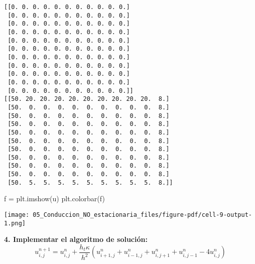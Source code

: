 \documentclass[
  letterpaper,
  DIV=11,
  numbers=noendperiod]{scrreprt}
\newenvironment{Shaded}{\begin{snugshade}}{\end{snugshade}}
\newcommand{\NormalTok}[1]{\textcolor[rgb]{0.00,0.23,0.31}{#1}}
\newcommand{\OperatorTok}[1]{\textcolor[rgb]{0.37,0.37,0.37}{#1}}
\begin{document}
\begin{verbatim}
[[0. 0. 0. 0. 0. 0. 0. 0. 0. 0. 0.]
 [0. 0. 0. 0. 0. 0. 0. 0. 0. 0. 0.]
 [0. 0. 0. 0. 0. 0. 0. 0. 0. 0. 0.]
 [0. 0. 0. 0. 0. 0. 0. 0. 0. 0. 0.]
 [0. 0. 0. 0. 0. 0. 0. 0. 0. 0. 0.]
 [0. 0. 0. 0. 0. 0. 0. 0. 0. 0. 0.]
 [0. 0. 0. 0. 0. 0. 0. 0. 0. 0. 0.]
 [0. 0. 0. 0. 0. 0. 0. 0. 0. 0. 0.]
 [0. 0. 0. 0. 0. 0. 0. 0. 0. 0. 0.]
 [0. 0. 0. 0. 0. 0. 0. 0. 0. 0. 0.]
 [0. 0. 0. 0. 0. 0. 0. 0. 0. 0. 0.]]
[[50. 20. 20. 20. 20. 20. 20. 20. 20. 20.  8.]
 [50.  0.  0.  0.  0.  0.  0.  0.  0.  0.  8.]
 [50.  0.  0.  0.  0.  0.  0.  0.  0.  0.  8.]
 [50.  0.  0.  0.  0.  0.  0.  0.  0.  0.  8.]
 [50.  0.  0.  0.  0.  0.  0.  0.  0.  0.  8.]
 [50.  0.  0.  0.  0.  0.  0.  0.  0.  0.  8.]
 [50.  0.  0.  0.  0.  0.  0.  0.  0.  0.  8.]
 [50.  0.  0.  0.  0.  0.  0.  0.  0.  0.  8.]
 [50.  0.  0.  0.  0.  0.  0.  0.  0.  0.  8.]
 [50.  0.  0.  0.  0.  0.  0.  0.  0.  0.  8.]
 [50.  5.  5.  5.  5.  5.  5.  5.  5.  5.  8.]]
\end{verbatim}

\begin{Shaded}
\begin{Highlighting}[]
\NormalTok{f }\OperatorTok{=}\NormalTok{ plt.imshow(u)}
\NormalTok{plt.colorbar(f)}
\end{Highlighting}
\end{Shaded}

\texttt{[image: 05\_Conduccion\_NO\_estacionaria\_files/figure-pdf/cell-9-output-1.png]}

\textbf{4. Implementar el algoritmo de solución:} \[
u_{i,j}^{n+1} = u_{i,j}^n + \dfrac{h_t \kappa}{h^2} 
\left(u_{i+1,j}^n + u_{i-1,j}^n + u_{i,j+1}^n + u_{i,j-1}^n - 4u_{i,j}^n\right) 
\]
\end{document}
